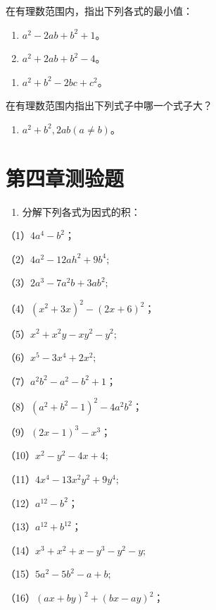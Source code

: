 在有理数范围内，指出下列各式的最小值：

\begin{enumerate}[start=31]
\item
  \(a^2 - 2ab + b^2 + 1\)。
\item
  \(a^2 + 2ab + b^2 - 4\)。
\end{enumerate}

\begin{enumerate}[start=33]
\item
  \(a^2 + b^2 - 2bc + c^2\)。
\end{enumerate}

在有理数范围内指出下列式子中哪一个式子大？

\begin{enumerate}[start=34]
\item
  \(a^2 + b^2, 2ab (a \neq b)\)。
\end{enumerate}

\section{第四章测验题}

\begin{enumerate}
\item
  分解下列各式为因式的积：
\end{enumerate}

（1）\(4a^{4} - b^{2}\)；

（2）\(4a^{2} - 12ah^{2} + 9b^{4};\)

（3）\(2a^{3} - 7a^{2}b + 3ab^{2};\)

（4）\((x^{2} + 3x)^{2} - (2x + 6)^{2}\)；

（5）\(x^{2} + x^{2}y - xy^{2} - y^{2};\)

（6）\(x^{5} - 3x^{4} + 2x^{2};\)

（7）\(a^2 b^2 - a^2 - b^2 + 1\)；

（8）\((a^2 + b^2 - 1)^2 - 4a^2b^2\)；

（9）\((2x - 1)^{3} - x^{3}\)；

（10）\(x^{2} - y^{2} - 4x + 4;\)

（11）\(4x^{4} - 13x^{2}y^{2} + 9y^{4};\)

（12）\(a^{12} - b^{2}\)；

（13）\(a^{12} + b^{12}\)；

（14）\(x^{3} + x^{2} + x - y^{3} - y^{2} - y;\)

（15）\(5a^{2} - 5b^{2} - a + b;\)

（16）\((ax + by)^2 + (bx - ay)^2\)；

